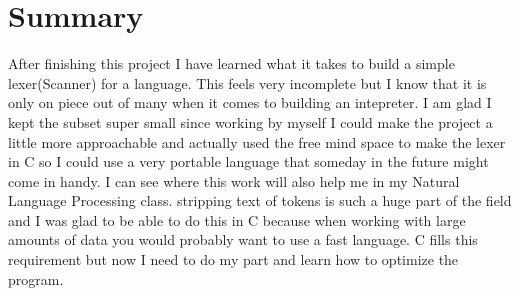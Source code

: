 \documentclass{report}
\begin{document}
\section{Summary}
After finishing this project I have learned what it takes to build a simple lexer(Scanner) for a language. 
This feels very incomplete but I know that it is only on piece out of many when it comes to building an intepreter. 
I am glad I kept the subset super small since working by myself I could make the project a little more approachable and actually used the free mind space to make the lexer in C so I could use a very portable language that someday in the future might come in handy. 
I can see where this work will also help me in my Natural Language Processing class. 
stripping text of tokens is such a huge part of the field and I was glad to be able to do this in C because when working with large amounts of data you would probably want to use a fast language. 
C fills this requirement but now I need to do my part and learn how to optimize the program. 
\end{document}

